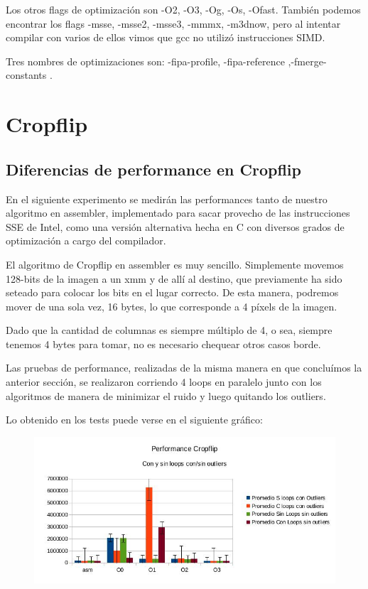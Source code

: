 \documentclass[a4paper]{article}
\begin{document}
Los otros flags de optimización son -O2, -O3, -Og, -Os, -Ofast. También podemos encontrar los flags -msse, -msse2, -msse3, -mmmx, -m3dnow, pero al intentar compilar con varios de ellos vimos que gcc no utilizó instrucciones SIMD.

Tres nombres de optimizaciones son: -fipa-profile, -fipa-reference ,-fmerge-constants .

\newpage

\section{Cropflip}

\subsection{Diferencias de performance en Cropflip}
En el siguiente experimento se medirán las performances tanto de nuestro algoritmo en assembler, implementado para sacar provecho de las instrucciones SSE de Intel, como una versión alternativa hecha en C con diversos grados de optimización a cargo del compilador.

El algoritmo de Cropflip en assembler es muy sencillo. Simplemente movemos 128-bits de la imagen a un xmm y de allí al destino, que previamente ha sido seteado para colocar los bits en el lugar correcto. De esta manera, podremos mover de una sola vez, 16 bytes, lo que corresponde a 4 píxels de la imagen.

Dado que la cantidad de columnas es siempre múltiplo de 4, o sea, siempre tenemos 4 bytes para tomar, no es necesario chequear otros casos borde.

Las pruebas de performance, realizadas de la misma manera en que concluímos la anterior sección, se realizaron corriendo 4 loops en paralelo junto con los algoritmos de manera de minimizar el ruido y luego quitando los outliers.

Lo obtenido en los tests puede verse en el siguiente gráfico:

\begin{figure}[h!]
  \begin{center}
	\includegraphics[scale=0.66]{Graficos1.4/crop/per.jpg}
	\label{nombreparareferenciar5}
  \end{center}
\end{figure}
\end{document}
